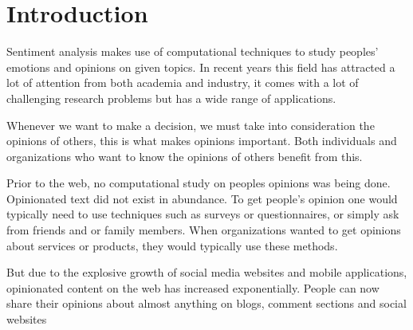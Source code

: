 \chapter{Introduction}\label{ch:INTRO}

Sentiment analysis makes use of computational techniques to study peoples' emotions and opinions
on given topics. In recent years this field has attracted a lot of attention from both academia and industry, it comes with a lot of challenging research problems but has a wide range of applications.

Whenever we want to make a decision, we must take into consideration the opinions of others, this is what makes opinions important. Both individuals and organizations who want to know the opinions of others benefit from this.

Prior to the web,  no computational study on peoples opinions was being done. Opinionated text did not exist in abundance. To get people's opinion one would typically need to use techniques such as surveys or questionnaires, or simply ask from friends and or family members.
When organizations wanted to get opinions about services or products, they would typically use these methods.   

But due to the explosive growth of social media websites and mobile applications, opinionated content on the web has increased exponentially. People can now share their opinions about almost anything on blogs, comment sections and social websites \cite{ref47}





